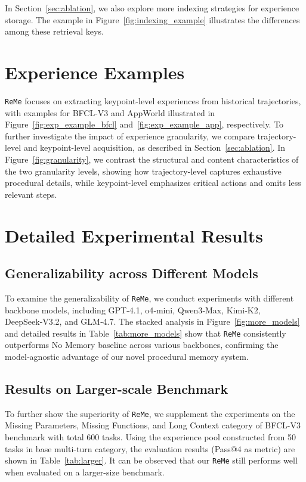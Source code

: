 \documentclass[11pt]{article}
\newcommand{\ours}{\texttt{ReMe}}
\begin{document}
In Section~\ref{sec:ablation}, we also explore more indexing strategies for experience storage. 
The example in Figure~\ref{fig:indexing_example} illustrates the differences among these retrieval keys. 

\section{Experience Examples}\label{app:example}
{\ours} focuses on extracting keypoint-level experiences from historical trajectories, with examples for BFCL-V3 and AppWorld illustrated in Figure~\ref{fig:exp_example_bfcl} and~\ref{fig:exp_example_app}, respectively. 
To further investigate the impact of experience granularity, we compare trajectory-level and keypoint-level acquisition, as described in Section~\ref{sec:ablation}. 
In Figure~\ref{fig:granularity}, we contrast the structural and content characteristics of the two granularity levels, showing how trajectory-level captures exhaustive procedural details, while keypoint-level emphasizes critical actions and omits less relevant steps.


\section{Detailed Experimental Results}
\subsection{Generalizability across Different Models}
To examine the generalizability of {\ours}, we conduct experiments with different backbone models, including GPT-4.1, o4‑mini, Qwen3‑Max, Kimi‑K2, DeepSeek‑V3.2, and GLM‑4.7. 
The stacked analysis in Figure~\ref{fig:more_models} and detailed results in Table~\ref{tab:more_models} show that {\ours} consistently outperforms No Memory baseline across various backbones, confirming the model‑agnostic advantage of our novel procedural memory system.

\subsection{Results on Larger-scale Benchmark}\label{app:larger_benchmark}
To further show the superiority of {\ours}, we supplement the experiments on the Missing Parameters, Missing Functions, and Long Context category of BFCL-V3 benchmark with total 600 tasks. 
Using the experience pool constructed from 50 tasks in base multi-turn category, the evaluation results (Pass@4 as metric) are shown in Table~\ref{tab:larger}.
It can be observed that our {\ours} still performs well when evaluated on a larger-size benchmark.
\end{document}
